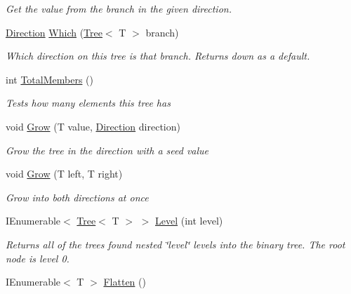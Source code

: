 \begin{DoxyCompactItemize}
\begin{DoxyCompactList}\small\item\em Get the value from the branch in the given direction. \end{DoxyCompactList}\item 
\hyperlink{namespaceHumDrum_1_1Structures_a83ca1f04475980cb7e79d471cc746dd3}{Direction} \hyperlink{classHumDrum_1_1Structures_1_1Tree_a4dafe6dc20f50241dc64e7f9c9395e79}{Which} (\hyperlink{classHumDrum_1_1Structures_1_1Tree}{Tree}$<$ T $>$ branch)
\begin{DoxyCompactList}\small\item\em Which direction on this tree is that branch. Returns down as a default. \end{DoxyCompactList}\item 
int \hyperlink{classHumDrum_1_1Structures_1_1Tree_a86e290317915685c03585c52e0b06d2e}{Total\+Members} ()
\begin{DoxyCompactList}\small\item\em Tests how many elements this tree has \end{DoxyCompactList}\item 
void \hyperlink{classHumDrum_1_1Structures_1_1Tree_a2b9d46fbc4593d107cc63af0283115f8}{Grow} (T value, \hyperlink{namespaceHumDrum_1_1Structures_a83ca1f04475980cb7e79d471cc746dd3}{Direction} direction)
\begin{DoxyCompactList}\small\item\em Grow the tree in the direction with a seed value \end{DoxyCompactList}\item 
void \hyperlink{classHumDrum_1_1Structures_1_1Tree_a02626ae83149d0615ede143167006cb6}{Grow} (T left, T right)
\begin{DoxyCompactList}\small\item\em Grow into both directions at once \end{DoxyCompactList}\item 
I\+Enumerable$<$ \hyperlink{classHumDrum_1_1Structures_1_1Tree}{Tree}$<$ T $>$ $>$ \hyperlink{classHumDrum_1_1Structures_1_1Tree_aabb0714bffc411219be70948cd37da50}{Level} (int level)
\begin{DoxyCompactList}\small\item\em Returns all of the trees found nested \char`\"{}level\char`\"{} levels into the binary tree. The root node is level 0. \end{DoxyCompactList}\item 
I\+Enumerable$<$ T $>$ \hyperlink{classHumDrum_1_1Structures_1_1Tree_afbb935f51b88b0ea624f7e79cae89e3a}{Flatten} ()

\end{DoxyCompactItemize}
